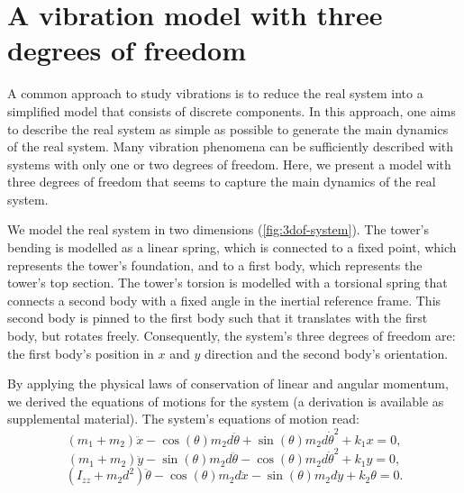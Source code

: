 \documentclass{article}
\begin{document}
\clearpage

\section{A vibration model with three degrees of freedom}
\label{sec:3dof}

A common approach to study vibrations is to reduce the real system into a simplified model that consists of discrete components. In this approach, one aims to describe the real system as simple as possible to generate the main dynamics of the real system. Many vibration phenomena can be sufficiently described with systems with only one or two degrees of freedom. Here, we present a model with three degrees of freedom that seems to capture the main dynamics of the real system.
\par 
We model the real system in two dimensions (\autoref{fig:3dof-system}). The tower's bending is modelled as a linear spring, which is connected to a fixed point, which represents the tower's foundation, and to a first body, which represents the tower's top section. The tower's torsion is modelled with a torsional spring that connects a second body with a fixed angle in the inertial reference frame. This second body is pinned to the first body such that it translates with the first body, but rotates freely. Consequently, the system's three degrees of freedom are: the first body's position in $x$ and $y$ direction and the second body's orientation.
\par 
By applying the physical laws of conservation of linear and angular momentum, we derived the equations of motions for the system (a derivation is available as supplemental material). The system's equations of motion read:
\begin{equation}
    (m_1 + m_2) \ddot{x} - \cos(\theta) m_2 d \ddot{\theta} + \sin(\theta) m_2 d \dot{\theta}^2 + k_1 x = 0,\label{eq:eom-x}
\end{equation}
\begin{equation}
    (m_1 + m_2) \ddot{y} - \sin(\theta) m_2 d \ddot{\theta} - \cos(\theta) m_2 d \dot{\theta}^2 + k_1 y = 0,\label{eq:eom-y}
\end{equation}
\begin{equation}
    (I_{zz} + m_2 d^2)\ddot{\theta} - \cos(\theta) m_2 d \ddot{x} - \sin(\theta)m_2 d \ddot{y} + k_2 \theta = 0.\label{eq:eom-theta}
\end{equation}
\end{document}
